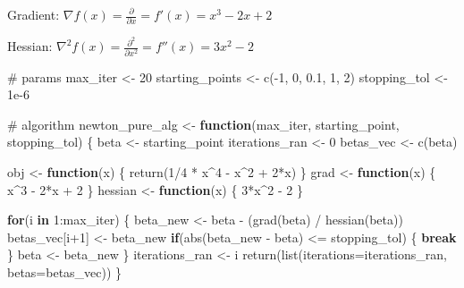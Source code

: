 \documentclass[
  letterpaper,
  DIV=11,
  numbers=noendperiod]{scrartcl}
\newenvironment{Shaded}{\begin{snugshade}}{\end{snugshade}}
\newcommand{\AttributeTok}[1]{\textcolor[rgb]{0.40,0.45,0.13}{#1}}
\newcommand{\CommentTok}[1]{\textcolor[rgb]{0.37,0.37,0.37}{#1}}
\newcommand{\ControlFlowTok}[1]{\textcolor[rgb]{0.00,0.23,0.31}{\textbf{#1}}}
\newcommand{\DecValTok}[1]{\textcolor[rgb]{0.68,0.00,0.00}{#1}}
\newcommand{\FloatTok}[1]{\textcolor[rgb]{0.68,0.00,0.00}{#1}}
\newcommand{\FunctionTok}[1]{\textcolor[rgb]{0.28,0.35,0.67}{#1}}
\newcommand{\NormalTok}[1]{\textcolor[rgb]{0.00,0.23,0.31}{#1}}
\newcommand{\OtherTok}[1]{\textcolor[rgb]{0.00,0.23,0.31}{#1}}
\newcommand{\SpecialCharTok}[1]{\textcolor[rgb]{0.37,0.37,0.37}{#1}}
\begin{document}
Gradient:
\(\nabla f(x) = \frac{\partial}{\partial x} = f'(x) = x^3 - 2x + 2\)

Hessian:
\(\nabla^2 f(x) = \frac{\partial^2}{\partial x^2} = f''(x) = 3x^2 - 2\)

\begin{Shaded}
\begin{Highlighting}[]
\CommentTok{\# params}
\NormalTok{max\_iter }\OtherTok{\textless{}{-}} \DecValTok{20}
\NormalTok{starting\_points }\OtherTok{\textless{}{-}} \FunctionTok{c}\NormalTok{(}\SpecialCharTok{{-}}\DecValTok{1}\NormalTok{, }\DecValTok{0}\NormalTok{, }\FloatTok{0.1}\NormalTok{, }\DecValTok{1}\NormalTok{, }\DecValTok{2}\NormalTok{)}
\NormalTok{stopping\_tol }\OtherTok{\textless{}{-}} \FloatTok{1e{-}6}


\CommentTok{\# algorithm}
\NormalTok{newton\_pure\_alg }\OtherTok{\textless{}{-}} \ControlFlowTok{function}\NormalTok{(max\_iter, starting\_point, stopping\_tol) \{}
\NormalTok{  beta }\OtherTok{\textless{}{-}}\NormalTok{ starting\_point}
\NormalTok{  iterations\_ran }\OtherTok{\textless{}{-}} \DecValTok{0}
\NormalTok{  betas\_vec }\OtherTok{\textless{}{-}} \FunctionTok{c}\NormalTok{(beta)}
  
\NormalTok{  obj }\OtherTok{\textless{}{-}} \ControlFlowTok{function}\NormalTok{(x) \{}
  \FunctionTok{return}\NormalTok{(}\DecValTok{1}\SpecialCharTok{/}\DecValTok{4} \SpecialCharTok{*}\NormalTok{ x}\SpecialCharTok{\^{}}\DecValTok{4} \SpecialCharTok{{-}}\NormalTok{ x}\SpecialCharTok{\^{}}\DecValTok{2} \SpecialCharTok{+} \DecValTok{2}\SpecialCharTok{*}\NormalTok{x)}
\NormalTok{  \}}
\NormalTok{  grad }\OtherTok{\textless{}{-}} \ControlFlowTok{function}\NormalTok{(x) \{}
\NormalTok{    x}\SpecialCharTok{\^{}}\DecValTok{3} \SpecialCharTok{{-}} \DecValTok{2}\SpecialCharTok{*}\NormalTok{x }\SpecialCharTok{+} \DecValTok{2}
\NormalTok{  \}}
\NormalTok{  hessian }\OtherTok{\textless{}{-}} \ControlFlowTok{function}\NormalTok{(x) \{}
    \DecValTok{3}\SpecialCharTok{*}\NormalTok{x}\SpecialCharTok{\^{}}\DecValTok{2} \SpecialCharTok{{-}} \DecValTok{2}
\NormalTok{  \}}
  
  \ControlFlowTok{for}\NormalTok{(i }\ControlFlowTok{in} \DecValTok{1}\SpecialCharTok{:}\NormalTok{max\_iter) \{}
\NormalTok{    beta\_new }\OtherTok{\textless{}{-}}\NormalTok{ beta }\SpecialCharTok{{-}}\NormalTok{ (}\FunctionTok{grad}\NormalTok{(beta) }\SpecialCharTok{/} \FunctionTok{hessian}\NormalTok{(beta))}
\NormalTok{    betas\_vec[i}\SpecialCharTok{+}\DecValTok{1}\NormalTok{] }\OtherTok{\textless{}{-}}\NormalTok{ beta\_new}
    \ControlFlowTok{if}\NormalTok{(}\FunctionTok{abs}\NormalTok{(beta\_new }\SpecialCharTok{{-}}\NormalTok{ beta) }\SpecialCharTok{\textless{}=}\NormalTok{ stopping\_tol) \{ }\ControlFlowTok{break}\NormalTok{ \}}
\NormalTok{    beta }\OtherTok{\textless{}{-}}\NormalTok{ beta\_new}
\NormalTok{  \}}
\NormalTok{  iterations\_ran }\OtherTok{\textless{}{-}}\NormalTok{ i}
  \FunctionTok{return}\NormalTok{(}\FunctionTok{list}\NormalTok{(}\AttributeTok{iterations=}\NormalTok{iterations\_ran, }\AttributeTok{betas=}\NormalTok{betas\_vec))}
\NormalTok{\}}


\end{Highlighting}
\end{Shaded}
\end{document}
